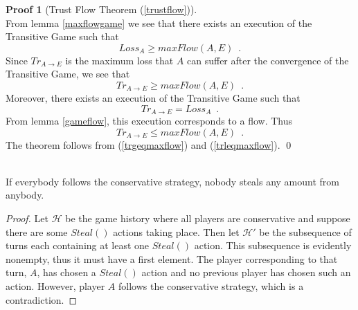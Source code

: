 \documentclass[11pt]{llncs}
\theoremstyle{definition}
\newtheorem{sepproof}{Proof}
\begin{document}
    \begin{sepproof}[Trust Flow Theorem (\ref{trustflow})] \ \\
       From lemma \ref{maxflowgame} we see that there exists an execution of the Transitive Game such that
       \begin{equation*}
          Loss_A \geq maxFlow\left(A, E\right) \enspace.
       \end{equation*}
       Since $Tr_{A \rightarrow E}$ is the maximum loss that $A$ can suffer after the convergence of the Transitive Game, we
       see that
       \begin{equation}
       \label{trgeqmaxflow}
          Tr_{A \rightarrow E} \geq maxFlow\left(A, E\right) \enspace.
       \end{equation}
       Moreover, there exists an execution of the Transitive Game such that
       \begin{equation*}
          Tr_{A \rightarrow E} = Loss_A \enspace.
       \end{equation*}
       From lemma \ref{gameflow}, this execution corresponds to a flow. Thus
       \begin{equation}
       \label{trleqmaxflow}
          Tr_{A \rightarrow E} \leq maxFlow\left(A, E\right) \enspace.
       \end{equation}
       The theorem follows from (\ref{trgeqmaxflow}) and (\ref{trleqmaxflow}). \qed
    \end{sepproof}

    \begin{theorem} \ \\
       \label{conservativeworld}
       If everybody follows the conservative strategy, nobody steals any amount from anybody.
    \end{theorem}
     \begin{proof}
        Let $\mathcal{H}$ be the game history where all players are conservative and suppose there are some
        $Steal\left(\right)$ actions taking place. Then let $\mathcal{H}'$ be the subsequence of turns each containing at
        least one $Steal\left(\right)$ action. This subsequence is evidently nonempty, thus it must have a first element. The
        player corresponding to that turn, $A$, has chosen a $Steal\left(\right)$ action and no previous player has chosen
        such an action. However, player $A$ follows the conservative strategy, which is a contradiction.
     \end{proof}
\end{document}
